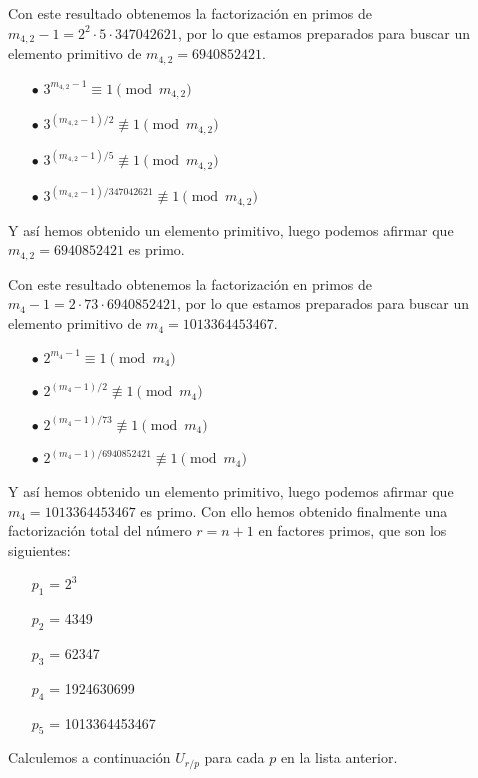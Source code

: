 \documentclass[fleqn]{article}
\begin{document}
    Con este resultado obtenemos la factorización en primos de $m_{4,2} - 1 = 2^2 \cdot 5 \cdot 347042621$, por lo que estamos preparados para buscar un elemento primitivo de $m_{4,2} = 6940852421$.
    \begin{enumerate}
        \item[$\bullet$] $3^{m_{4,2} -1} \equiv 1 \pmod{m_{4,2}}$
        \item[$\bullet$] $3^{(m_{4,2} -1)/2} \not\equiv 1 \pmod{m_{4,2}}$
        \item[$\bullet$] $3^{(m_{4,2} -1)/5} \not\equiv 1 \pmod{m_{4,2}}$ 
        \item[$\bullet$] $3^{(m_{4,2} -1)/347042621} \not\equiv 1 \pmod{m_{4,2}}$
    \end{enumerate}
    Y así hemos obtenido un elemento primitivo, luego podemos afirmar que $m_{4,2} = 6940852421$ es primo.

    Con este resultado obtenemos la factorización en primos de $m_{4} - 1 = 2 \cdot 73 \cdot 6940852421$, por lo que estamos preparados para buscar un elemento primitivo de $m_{4} = 1013364453467$.
    \begin{enumerate}
        \item[$\bullet$] $2^{m_{4} -1} \equiv 1 \pmod{m_{4}}$
        \item[$\bullet$] $2^{(m_{4} -1)/2} \not\equiv 1 \pmod{m_{4}}$
        \item[$\bullet$] $2^{(m_{4} -1)/73} \not\equiv 1 \pmod{m_{4}}$
        \item[$\bullet$] $2^{(m_{4} -1)/6940852421} \not\equiv 1 \pmod{m_{4}}$
    \end{enumerate}
    Y así hemos obtenido un elemento primitivo, luego podemos afirmar que $m_{4} = 1013364453467$ es primo.
    Con ello hemos obtenido finalmente una factorización total del número $r = n+1$ en factores primos, que son los siguientes:
    \begin{enumerate}
        \item[$p_1$ =] $2^3$
        \item[$p_2$ =] 4349
        \item[$p_3$ =] 62347
        \item[$p_4$ =] 1924630699 
        \item[$p_5$ =] 1013364453467 
    \end{enumerate}
    Calculemos a continuación $U_{r/p}$ para cada $p$ en la lista anterior.
\end{document}
